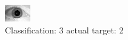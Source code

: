 \begin{figure}[h!]
\begin{center}
\includegraphics[width=0.60\columnwidth]{figures/ID1662_class_3_target_2.png}
\end{center}
\caption{ Classification: 3 actual target: 2}
\label{fig:ID1662_class_3_target_2}
\end{figure}

